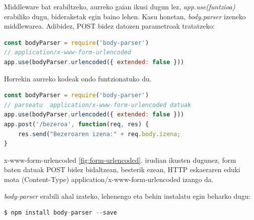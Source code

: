 Middleware bat erabiltzeko, aurreko gaian ikusi dugun lez, \textit{app.use(funtzioa)} erabiliko dugu, bideraketak egin baino lehen. Kasu honetan, \textit{body.parser} izeneko middlewarea. Adibidez, POST bidez datozen parametroak tratatzeko:

\begin{lstlisting}[language=JavaScript]
const bodyParser = require('body-parser')
// application/x-www-form-urlencoded
app.use(bodyParser.urlencoded({ extended: false }))
\end{lstlisting}

Horrekin aurreko kodeak ondo funtzionatuko du. 

\begin{lstlisting}[language=JavaScript]
const bodyParser = require('body-parser')
// parseatu  application/x-www-form-urlencoded datuak
app.use(bodyParser.urlencoded({ extended: false }))
app.post('/bezeroa', function(req, res) {
    res.send("Bezeroaren izena:" + req.body.izena;
}
\end{lstlisting}

\begin{alertinfo}{x-www-form-urlencoded}
\ref{fig:form-urlencoded}. irudian ikusten dugunez, form baten datuak POST bidez bidaltzean, besterik ezean, HTTP eskaeraren eduki mota (Content-Type) application/x-www-form-urlencoded izango da.
\end{alertinfo}


\textit{body-parser} erabili ahal izateko, lehenengo eta behin instalatu egin beharko  dugu:

\begin{lstlisting}[language=JavaScript]
$ npm install body-parser --save
\end{lstlisting}



